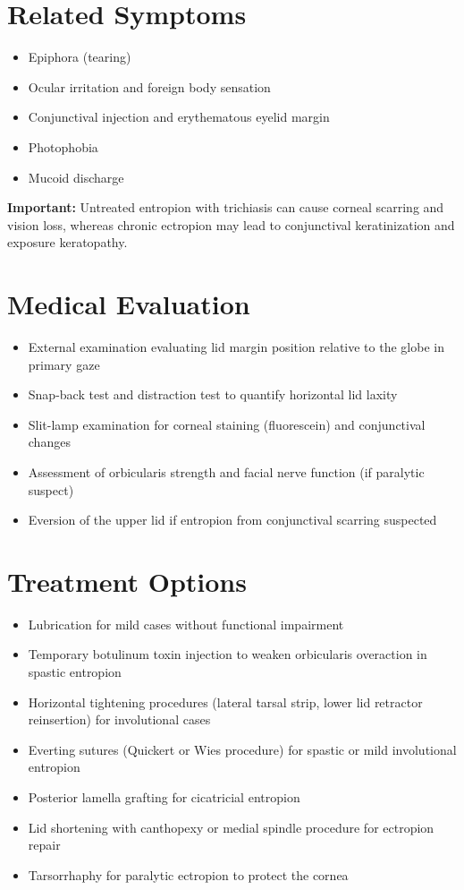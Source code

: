 \section*{Related Symptoms}
\begin{itemize}
  \item Epiphora (tearing)
  \item Ocular irritation and foreign body sensation
  \item Conjunctival injection and erythematous eyelid margin
  \item Photophobia
  \item Mucoid discharge
\end{itemize}
\textbf{Important:} Untreated entropion with trichiasis can cause corneal scarring and vision loss, whereas chronic ectropion may lead to conjunctival keratinization and exposure keratopathy.

\section*{Medical Evaluation}
\begin{itemize}
  \item External examination evaluating lid margin position relative to the globe in primary gaze
  \item Snap-back test and distraction test to quantify horizontal lid laxity
  \item Slit-lamp examination for corneal staining (fluorescein) and conjunctival changes
  \item Assessment of orbicularis strength and facial nerve function (if paralytic suspect)
  \item Eversion of the upper lid if entropion from conjunctival scarring suspected
\end{itemize}

\section*{Treatment Options}
\begin{itemize}
  \item Lubrication for mild cases without functional impairment
  \item Temporary botulinum toxin injection to weaken orbicularis overaction in spastic entropion
  \item Horizontal tightening procedures (lateral tarsal strip, lower lid retractor reinsertion) for involutional cases
  \item Everting sutures (Quickert or Wies procedure) for spastic or mild involutional entropion
  \item Posterior lamella grafting for cicatricial entropion
  \item Lid shortening with canthopexy or medial spindle procedure for ectropion repair
  \item Tarsorrhaphy for paralytic ectropion to protect the cornea
\end{itemize}

